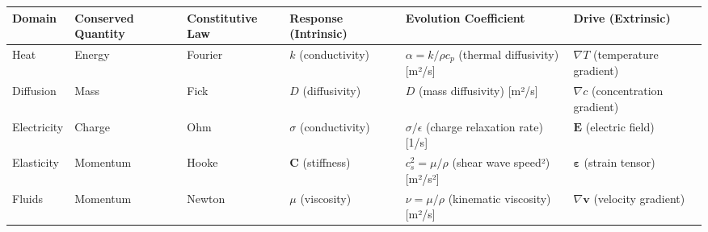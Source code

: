 \documentclass[
  letterpaper,
  DIV=11,
  numbers=noendperiod]{scrartcl}
\begin{document}
\begin{longtable}[]{@{}
  >{\raggedright\arraybackslash}p{}
  >{\raggedright\arraybackslash}p{}
  >{\raggedright\arraybackslash}p{}
  >{\raggedright\arraybackslash}p{}
  >{\raggedright\arraybackslash}p{}
  >{\raggedright\arraybackslash}p{}@{}}
\toprule\noalign{}
\begin{minipage}[b]{\linewidth}\raggedright
Domain
\end{minipage} & \begin{minipage}[b]{\linewidth}\raggedright
Conserved Quantity
\end{minipage} & \begin{minipage}[b]{\linewidth}\raggedright
Constitutive Law
\end{minipage} & \begin{minipage}[b]{\linewidth}\raggedright
Response (Intrinsic)
\end{minipage} & \begin{minipage}[b]{\linewidth}\raggedright
Evolution Coefficient
\end{minipage} & \begin{minipage}[b]{\linewidth}\raggedright
Drive (Extrinsic)
\end{minipage} \\
\midrule\noalign{}
\endhead
\bottomrule\noalign{}
\endlastfoot
Heat & Energy & Fourier & \(k\) (conductivity) & \(\alpha = k/\rho c_p\)
(thermal diffusivity) {[}m²/s{]} & \(\nabla T\) (temperature
gradient) \\
Diffusion & Mass & Fick & \(D\) (diffusivity) & \(D\) (mass diffusivity)
{[}m²/s{]} & \(\nabla c\) (concentration gradient) \\
Electricity & Charge & Ohm & \(\sigma\) (conductivity) &
\(\sigma/\epsilon\) (charge relaxation rate) {[}1/s{]} & \(\mathbf{E}\)
(electric field) \\
Elasticity & Momentum & Hooke & \(\mathbf{C}\) (stiffness) &
\(c_s^2 = \mu/\rho\) (shear wave speed²) {[}m²/s²{]} &
\(\boldsymbol{\varepsilon}\) (strain tensor) \\
Fluids & Momentum & Newton & \(\mu\) (viscosity) & \(\nu = \mu/\rho\)
(kinematic viscosity) {[}m²/s{]} & \(\nabla \mathbf{v}\) (velocity
gradient) \\
\end{longtable}
\end{document}
